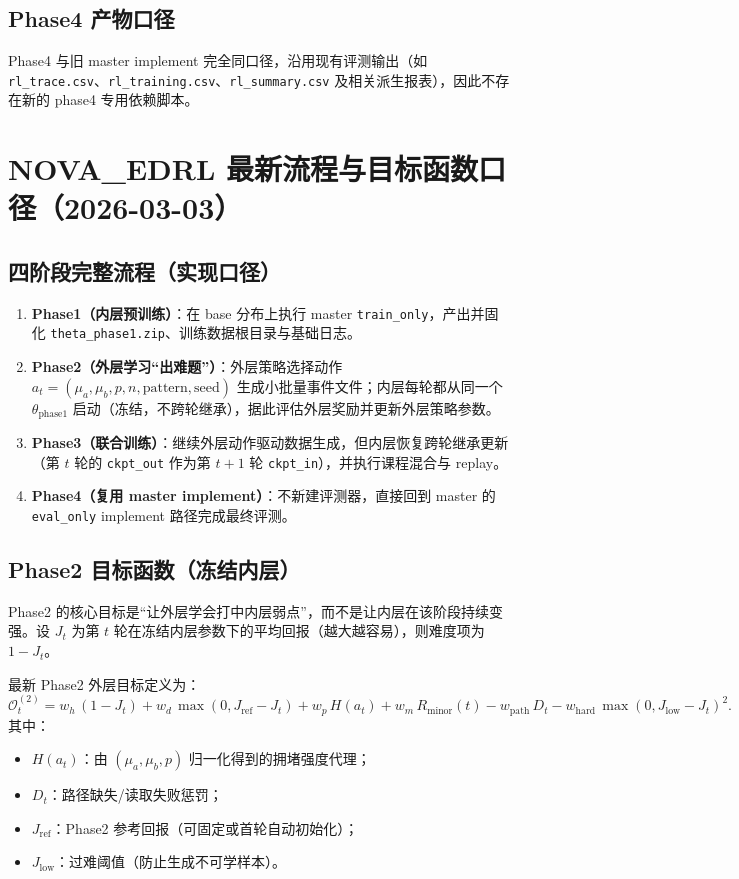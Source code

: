 \documentclass[UTF8,11pt,a4paper]{ctexart}
\begin{document}
\subsection{Phase4 产物口径}
Phase4 与旧 master implement 完全同口径，沿用现有评测输出（如 \texttt{rl\_trace.csv}、\texttt{rl\_training.csv}、\texttt{rl\_summary.csv} 及相关派生报表），因此不存在新的 phase4 专用依赖脚本。

\section{NOVA\_EDRL 最新流程与目标函数口径（2026-03-03）}
\subsection{四阶段完整流程（实现口径）}
\begin{enumerate}
\item \textbf{Phase1（内层预训练）}：在 base 分布上执行 master \texttt{train\_only}，产出并固化
\texttt{theta\_phase1.zip}、训练数据根目录与基础日志。
\item \textbf{Phase2（外层学习“出难题”）}：外层策略选择动作
\(
a_t=(\mu_a,\mu_b,p,n,\text{pattern},\text{seed})
\)
生成小批量事件文件；内层每轮都从同一个 \(\theta_{\mathrm{phase1}}\) 启动（冻结，不跨轮继承），据此评估外层奖励并更新外层策略参数。
\item \textbf{Phase3（联合训练）}：继续外层动作驱动数据生成，但内层恢复跨轮继承更新（第 \(t\) 轮的 \texttt{ckpt\_out} 作为第 \(t+1\) 轮 \texttt{ckpt\_in}），并执行课程混合与 replay。
\item \textbf{Phase4（复用 master implement）}：不新建评测器，直接回到 master 的 \texttt{eval\_only} implement 路径完成最终评测。
\end{enumerate}

\subsection{Phase2 目标函数（冻结内层）}
Phase2 的核心目标是“让外层学会打中内层弱点”，而不是让内层在该阶段持续变强。设
\(
J_t
\)
为第 \(t\) 轮在冻结内层参数下的平均回报（越大越容易），则难度项为
\(
1-J_t
\)。

最新 Phase2 外层目标定义为：
\begin{equation}
\label{eq:phase2_obj_latest}
\mathcal{O}^{(2)}_t
=
w_h\,(1-J_t)
+w_d\,\max(0, J_{\mathrm{ref}}-J_t)
+w_p\,H(a_t)
+w_m\,R_{\mathrm{minor}}(t)
-w_{\mathrm{path}}\,D_t
-w_{\mathrm{hard}}\,\max(0,J_{\mathrm{low}}-J_t)^2.
\end{equation}
其中：
\begin{itemize}
\item \(H(a_t)\)：由 \((\mu_a,\mu_b,p)\) 归一化得到的拥堵强度代理；
\item \(D_t\)：路径缺失/读取失败惩罚；
\item \(J_{\mathrm{ref}}\)：Phase2 参考回报（可固定或首轮自动初始化）；
\item \(J_{\mathrm{low}}\)：过难阈值（防止生成不可学样本）。
\end{itemize}
\end{document}
